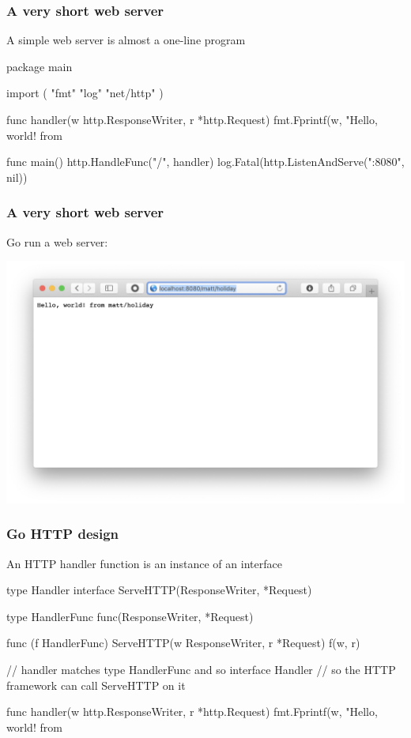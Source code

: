 \documentclass[handout,compress,t,11pt]{beamer}
\begin{document}
\begin{frame}[fragile]
    \frametitle{A very short web server}
    A simple web server is almost a one-line program \par
\begin{golang}
package main

import (
	"fmt"
    "log"
	"net/http"
)

func handler(w http.ResponseWriter, r *http.Request) {
    fmt.Fprintf(w, "Hello, world! from %
}

func main() {
    http.HandleFunc("/", handler)
    log.Fatal(http.ListenAndServe(":8080", nil))
}
\end{golang}
\end{frame}

\begin{frame}[fragile]
    \frametitle{A very short web server}
    Go run a web server:
    \begin{center}
    \includegraphics[width=.9\textwidth]{hello-world-http.png}
    \end{center}
\end{frame}

\begin{frame}[fragile]
    \frametitle{Go HTTP design}
    An HTTP handler function is an instance of an interface
\begin{golang}
type Handler interface {
	ServeHTTP(ResponseWriter, *Request)
}
    
type HandlerFunc func(ResponseWriter, *Request)

func (f HandlerFunc) ServeHTTP(w ResponseWriter, r *Request) {
    f(w, r)
}

// handler matches type HandlerFunc and so interface Handler
// so the HTTP framework can call ServeHTTP on it

func handler(w http.ResponseWriter, r *http.Request) {
    fmt.Fprintf(w, "Hello, world! from %
}
\end{golang}
\end{frame}
\end{document}
